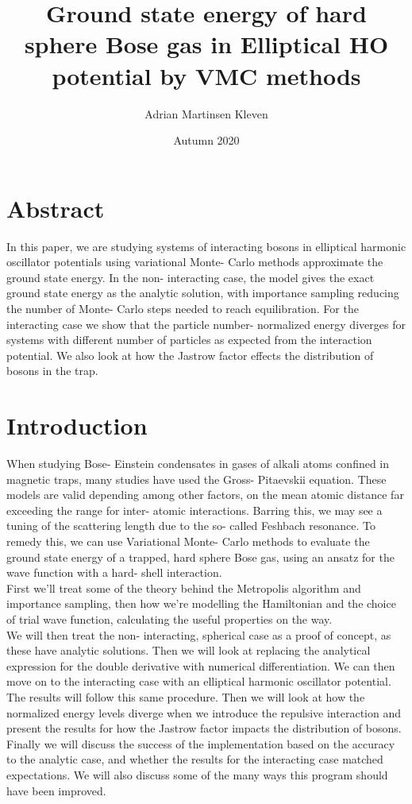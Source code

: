 \documentclass[11pt,a4paper,titlepage]{article}
\title{Ground state energy of hard sphere Bose gas in Elliptical HO potential by VMC methods}
\author{Adrian Martinsen Kleven}
\date{Autumn 2020}
\begin{document}
\maketitle
\tableofcontents
\listoffigures
\listoftables
\clearpage
\section{Abstract}
In this paper, we are studying systems of interacting bosons in elliptical harmonic oscillator potentials using variational Monte- Carlo methods approximate the ground state energy. In the non- interacting case, the model gives the exact ground state energy as the analytic solution, with importance sampling reducing the number of Monte- Carlo steps needed to reach equilibration. For the interacting case we show that the particle number- normalized energy diverges for systems with different number of particles as expected from the interaction potential. We also look at how the Jastrow factor effects the distribution of bosons in the trap. 

\section{Introduction}
When studying Bose- Einstein condensates in gases of alkali atoms confined in magnetic traps, many studies have used the Gross- Pitaevskii equation. These models are valid depending among other factors, on the mean atomic distance far exceeding the range for inter- atomic interactions. Barring this, we may see a tuning of the scattering length due to the so- called Feshbach resonance. To remedy this, we can use Variational Monte- Carlo methods to evaluate the ground state energy of a trapped, hard sphere Bose gas, using an ansatz for the wave function with a hard- shell interaction.\\First we'll treat some of the theory behind the Metropolis algorithm and importance sampling, then how we're modelling the Hamiltonian and the choice of trial wave function, calculating the useful properties on the way.\\We will then treat the non- interacting, spherical case as a proof of concept, as these have analytic solutions. Then we will look at replacing the analytical expression for the double derivative with numerical differentiation. We can then move on to the interacting case with an elliptical harmonic oscillator potential. The results will follow this same procedure. Then we will  look at how the normalized energy levels diverge when we introduce the repulsive interaction and present the results for how the Jastrow factor impacts the distribution of bosons.\\Finally we will discuss the success of the implementation based on the accuracy to the analytic case, and whether the results for the interacting case matched expectations. We will also discuss some of the many ways this program should have been improved.
\end{document}
